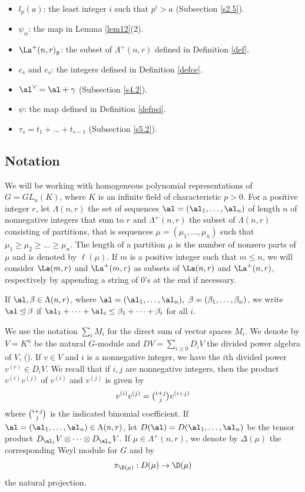 {\begin{itemize}
	\item  $l_p(a)$: the least integer $i$ such that $p^i>a$ (Subsection \ref{s2.5}).
	\item $\psi_\alpha$: the map in Lemma \ref{lem12}(2).
	\item $\La^{+}(n,r)_g$: the subset of $\Lambda^+(n,r)$ defined in Definition \ref{def}.
	\item $c_s$ and $e_s$: the integers defined in Definition \ref{defce}.
	\item $\al^{\vee} =\al+\gamma$ (Subsection \ref{s4.2}).
	\item $\psi$: the map defined in Definition \ref{defpsi}.
	\item $\tau_s=t_1 + \dots +t_{s-1}$ (Subsection \ref{s5.2}).
\end{itemize}}
\subsection{Notation}\label{s2.1}
We will be working with homogeneous polynomial representations of $G=GL_n(K)$, where $K$ is an infinite field of characteristic $p>0$.  For a positive integer $r$, let $\Lambda(n,r)$ the set of sequences $\al=(\al_1, \dots, \al_n)$ of length $n$ of nonnegative integers that sum to $r$ and  $\Lambda^+(n,r)$ the subset of $\Lambda(n,r)$ consisting of partitions, that is sequences $\mu=(\mu_1, \dots, \mu_n)$ such that $\mu_1 \ge \mu_2 \ge \dots \ge \mu_n$. The length  of a partition $\mu$ is the number of nonzero parts of $\mu$ and is denoted by $\ell(\mu)$. If $m$ is a positive integer such that $m \le n$, we will consider $\La(m,r)$ and $\La^+(m,r)$ as subsets of $\La(n,r)$ and $\La^+(n,r)$, respectively by appending a string of $0$'s at the end if necessary.  

If $\al, \beta \in \Lambda(n,r)$, where $\al=(\al_1,\dots, \al_n), \ \beta = (\beta_1,\dots,\beta_n)$, we write $\al \unlhd \beta$ if $\al_1+\dots+\al_i \le \beta_1+\dots+\beta_i$ for all $i$.

We use the notation $\sum_i M_i$ for the direct sum of vector spaces $M_i$. We denote by $V=K^n$ be the natural $G$-module and $DV=\sum_{i\geq 0}D_iV$ the divided power algebra of $V$, (\cite[Section I.4]{ABW}). If $v \in V$ and $i$ is a nonnegative integer, we have the $i$th divided power $v^{(r)} \in D_iV$. We recall that if $i,j$ are nonnegative integers, then the product $v^{(i)}v^{(j)}$ of $v^{(i)}$ and $v^{(j)}$ is given by \[v^{(i)}v^{(j)}=\tbinom{i+j}{j}v^{(i+j)}\] where $\tbinom{i+j}{j}$ is the indicated binomial coefficient. If $\al=(\al_1,\dots, \al_n) \in \Lambda(n,r)$, let $D(\al)=D(\al_1,\dots,\al_n)$ be the tensor product $D_{\al_1}V\otimes \dots \otimes D_{\al_n}V$. If $\mu \in \Lambda^+(n,r)$, we denote by $\Delta(\mu)$ the corresponding Weyl module for $G$ and by \[{\pi}_{\D(\mu)} : D(\mu) \to \D(\mu)\] the natural projection.

